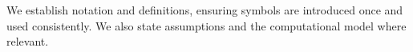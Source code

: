 We establish notation and definitions, ensuring symbols are introduced once and used consistently. We also state assumptions and the computational model where relevant.

